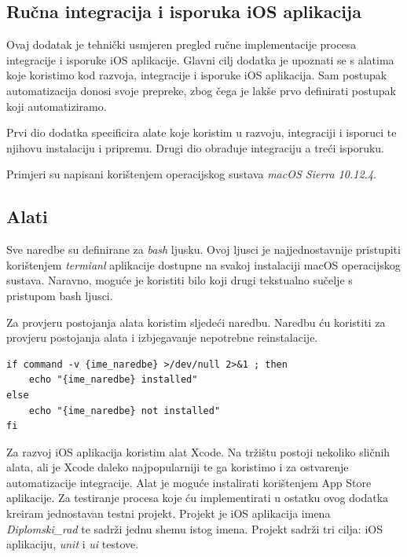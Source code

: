 \documentclass[times, utf8, diplomski, numeric]{fer}
\begin{document}
\begin{appendices}



\chapter{Ručna integracija i isporuka iOS aplikacija}

Ovaj dodatak je tehnički usmjeren pregled ručne implementacije procesa integracije i isporuke iOS aplikacije. Glavni cilj dodatka je upoznati se s alatima koje koristimo kod razvoja, integracije i isporuke iOS aplikacija. Sam postupak automatizacija donosi svoje prepreke, zbog čega je lakše prvo definirati postupak koji automatiziramo.

Prvi dio dodatka specificira alate koje koristim u razvoju, integraciji i isporuci te njihovu instalaciju i pripremu. Drugi dio obrađuje integraciju a treći isporuku.

Primjeri su napisani korištenjem operacijskog sustava \textit{macOS Sierra 10.12.4}.

\section{Alati}

Sve naredbe su definirane za \textit{bash} ljusku. Ovoj ljusci je najjednostavnije pristupiti korištenjem \textit{termianl} aplikacije dostupne na svakoj instalaciji macOS operacijskog sustava. Naravno, moguće je koristiti bilo koji drugi tekstualno sučelje s pristupom bash ljusci.

Za provjeru postojanja alata koristim sljedeći naredbu. Naredbu ću koristiti za provjeru postojanja alata i izbjegavanje nepotrebne reinstalacije.

\begin{verbatim}
if command -v {ime_naredbe} >/dev/null 2>&1 ; then
    echo "{ime_naredbe} installed"
else
    echo "{ime_naredbe} not installed"
fi
\end{verbatim}

Za razvoj iOS aplikacija koristim alat Xcode. Na tržištu postoji nekoliko sličnih alata, ali je Xcode daleko najpopularniji te ga koristimo i za ostvarenje automatizacije integracije. Alat je moguće instalirati korištenjem App Store aplikacije. Za testiranje procesa koje ću implementirati u ostatku ovog dodatka kreiram jednostavan testni projekt. Projekt je iOS aplikacija imena \textit{Diplomski\_rad} te sadrži jednu shemu istog imena. Projekt sadrži tri cilja: iOS aplikaciju, \textit{unit} i \textit{ui} testove.


\end{appendices}
\end{document}
